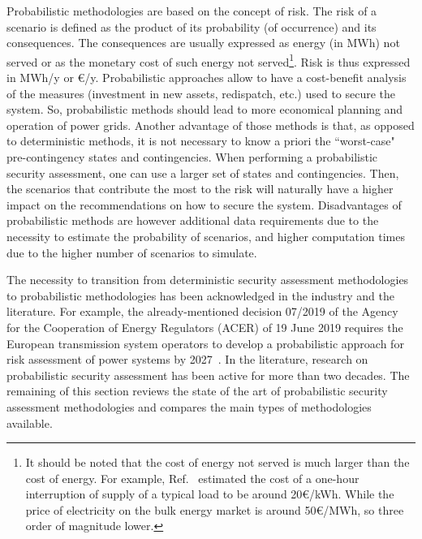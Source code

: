 Probabilistic methodologies are based on the concept of risk. The risk of a scenario is defined as the product of its probability (of occurrence) and its consequences. The consequences are usually expressed as energy (in MWh) not served or as the monetary cost of such energy not served\footnote{It should be noted that the cost of energy not served is much larger than the cost of energy. For example, Ref.~\cite{VOLL} estimated the cost of a one-hour interruption of supply of a typical load to be around 20€/kWh. While the price of electricity on the bulk energy market is around 50€/MWh, so three order of magnitude lower.}. Risk is thus expressed in MWh/y or €/y. Probabilistic approaches allow to have a cost-benefit analysis of the measures (investment in new assets, redispatch, etc.) used to secure the system. So, probabilistic methods should lead to more economical planning and operation of power grids. Another advantage of those methods is that, as opposed to deterministic methods, it is not necessary to know a priori the ``worst-case" pre-contingency states and contingencies. When performing a probabilistic security assessment, one can use a larger set of states and contingencies. Then, the scenarios that contribute the most to the risk will naturally have a higher impact on the recommendations on how to secure the system. Disadvantages of probabilistic methods are however additional data requirements due to the necessity to estimate the probability of scenarios, and higher computation times due to the higher number of scenarios to simulate.

The necessity to transition from deterministic security assessment methodologies to probabilistic methodologies has been acknowledged in the industry and the literature. For example, the already-mentioned decision 07/2019 of the Agency for the Cooperation of Energy Regulators (ACER) of 19 June 2019 requires the European transmission system operators to develop a probabilistic approach for risk assessment of power systems by 2027~\cite{ACER}. In the literature, research on probabilistic security assessment has been active for more than two decades. The remaining of this section reviews the state of the art of probabilistic security assessment methodologies and compares the main types of methodologies available.

